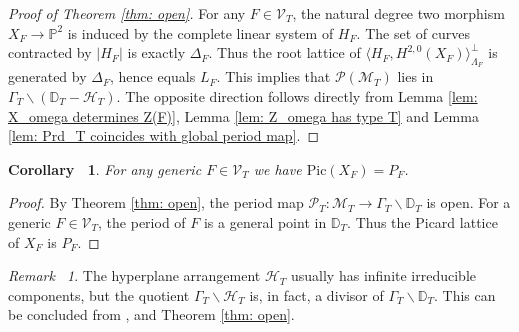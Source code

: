 \documentclass[12pt,reqno,a4paper]{amsart}
\newtheorem{cor}[thm]{Corollary~}
\theoremstyle{remark}
\newtheorem{rmk}[thm]{Remark~}
\theoremstyle{definition}
\newcommand{\PP}{\mathbb{P}}
\newcommand{\DD}{\mathbb{D}}
\newcommand{\Prd}{\mathscr{P}}
\newcommand{\calH}{\mathcal{H}}
\newcommand{\calM}{\mathcal{M}}
\newcommand{\calV}{\mathcal{V}}
\newcommand{\Pic}{\mathrm{Pic}}
\newcommand{\bs}{\backslash}
\begin{document}
\begin{proof}[Proof of Theorem \ref{thm: open}] 
    For any $F\in\calV_T$, the natural degree two morphism $X_F\to\PP^2$ is induced by the complete linear system of $H_F$.
    The set of curves contracted by $|H_F|$ is exactly $\Delta_F$.
    Thus the root lattice of $\langle H_F,H^{2,0}(X_F) \rangle^\perp_{\Lambda_F}$ is generated by $\Delta_F$, hence equals $L_F$.
    This implies that $\Prd(\calM_T)$ lies in $\Gamma_T\bs(\DD_T-\calH_T)$.
    The opposite direction follows directly from Lemma \ref{lem: X_omega determines Z(F)}, Lemma \ref{lem: Z_omega has type T} and Lemma \ref{lem: Prd_T coincides with global period map}.
\end{proof}


\begin{cor}
\label{cor: generic Picard}
For any generic $F\in\calV_T$ we have $\Pic(X_F)=P_F$.
\end{cor}
\begin{proof}
By Theorem \ref{thm: open}, the period map $\Prd_T \colon\calM_T\to \Gamma_T\bs \DD_T$ is open. For a generic $F\in \calV_T$, the period of $F$ is a general point in $\DD_T$. Thus the Picard lattice of $X_F$ is $P_F$.
\end{proof}

\begin{rmk}
    The hyperplane arrangement $\calH_T$ usually has infinite irreducible components, but the quotient $\Gamma_T\bs\calH_T$ is, in fact, a divisor of $\Gamma_T\bs\DD_T$.
    This can be concluded from \cite{baily1966compactification}, \cite{borel1972metric} and Theorem \ref{thm: open}.
\end{rmk}
\end{document}
